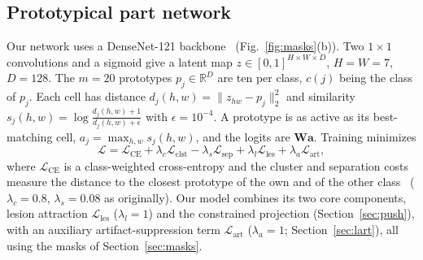 \documentclass[conference]{IEEEtran}
\newcommand{\Lles}{\mathcal{L}_{\mathrm{les}}}
\newcommand{\Lart}{\mathcal{L}_{\mathrm{art}}}
\begin{document}
\subsection{Prototypical part network}
Our network uses a DenseNet-121 backbone~\cite{huang2017} (Fig.~\ref{fig:masks}(b)). Two $1\times1$ convolutions and a sigmoid give a latent map $z\in[0,1]^{H\times W\times D}$, $H=W=7$, $D=128$. The $m=20$ prototypes $p_j\in\mathbb{R}^D$ are ten per class, $c(j)$ being the class of $p_j$. Each cell has distance $d_j(h,w)=\lVert z_{hw}-p_j\rVert_2^2$ and similarity $s_j(h,w)=\log\frac{d_j(h,w)+1}{d_j(h,w)+\epsilon}$ with $\epsilon=10^{-4}$. A prototype is as active as its best-matching cell, $a_j=\max_{h,w}s_j(h,w)$, and the logits are $\mathbf{W}\bm{a}$. Training minimizes
\begin{equation}
\mathcal{L}=\mathcal{L}_{\mathrm{CE}}+\lambda_c\mathcal{L}_{\mathrm{clst}}-\lambda_s\mathcal{L}_{\mathrm{sep}}+\lambda_l\Lles+\lambda_a\Lart ,
\label{eq:loss}
\end{equation}
where $\mathcal{L}_{\mathrm{CE}}$ is a class-weighted cross-entropy and the cluster and separation costs measure the distance to the closest prototype of the own and of the other class~\cite{chen2019} ($\lambda_c=0.8$, $\lambda_s=0.08$ as originally). Our model combines its two core components, lesion attraction $\Lles$ ($\lambda_l=1$) and the constrained projection (Section~\ref{sec:push}), with an auxiliary artifact-suppression term $\Lart$ ($\lambda_a=1$; Section~\ref{sec:lart}), all using the masks of Section~\ref{sec:masks}.
\end{document}
